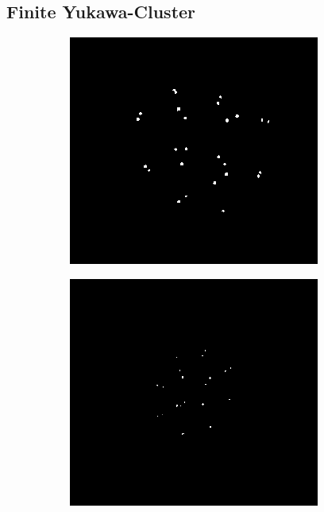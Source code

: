 \documentclass[numbers=noenddot,a4paper]{scrartcl}
\begin{document}
		\subsection{Finite Yukawa-Cluster}\label{sub:yukawaclust}

				\begin{figure}
					\centering
					\begin{subfigure}[b]{0.3\textwidth}
						\centering
						\includegraphics[width=\textwidth,height=\textwidth]{figs/rot00013ungestrt.png}
						\caption{}
						\label{img:rechts}
					\end{subfigure}
					\begin{subfigure}[b]{0.3\textwidth}
						\centering
						\includegraphics[width=\textwidth,height=\textwidth]{figs/gruen05006ungestrt.png}

\end{subfigure}
\end{figure}
\end{document}
